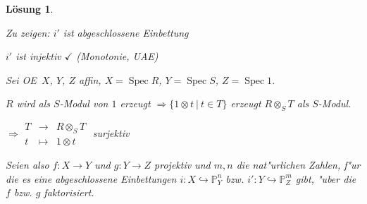 \documentclass[paper = A4, fontsize=12pt, numbers=noendperiod, chapterprefix=true]{scrbook}
\theoremstyle{break}
\newtheorem{Loes}{L\"osung}
\theoremstyle{nonumberbreak}
\theoremstyle{nonumberplain}
\newcommand{\schraffiert}{\ensuremath{\nicefrac{\nicefrac{}{}}{\nicefrac{}{}}}}
\DeclareMathOperator{\Spec}{Spec}
\newcommand{\IP}{\mathbb{P}}%
\newcommand{\X}{\times}
\renewcommand{\OE}{O\!\!E~}
\begin{document}
\begin{Loes}
\begin{enumerate}[a)]
\begin{description}[\setlabelstyle{\bfseries}]
		\begin{minipage}[c]{0.3\textwidth}\end{minipage}
		\begin{minipage}[c]{0.55\textwidth}\emph{Zu zeigen:} $i'$ ist abgeschlossene Einbettung
	
		$i'$ ist injektiv $\checkmark$ (Monotonie, UAE)\end{minipage}
		
		Sei \OE $X$, $Y$, $Z$ affin, $X = \Spec R$, $Y = \Spec S$, $Z = \Spec 1$.
		
		\begin{minipage}[c]{0.3\textwidth}\end{minipage}
		\begin{minipage}[c]{0.55\textwidth}$R$ wird als $S$-Modul von $1$ erzeugt $\Rightarrow \{1 \otimes t \ \vert \ t \in T\}$ erzeugt $R \otimes_S T$ als $S$-Modul.
		
		$\Rightarrow \begin{array}{ccc} T &\to& R \otimes_S T \\ t &\mapsto& 1 \otimes t \end{array}$ surjektiv\end{minipage}
	\end{description}

	 Seien also $f \colon X \to Y$ und $g \colon Y \to Z$ projektiv und $m, n$ die nat"urlichen Zahlen, f"ur die es eine abgeschlossene Einbettungen $i \colon X \hookrightarrow \IP^n_Y$ bzw. $i' \colon Y \hookrightarrow \IP^m_Z$ gibt, "uber die $f$ bzw. $g$ faktorisiert. 
 

\end{enumerate}
\end{Loes}
\end{document}
